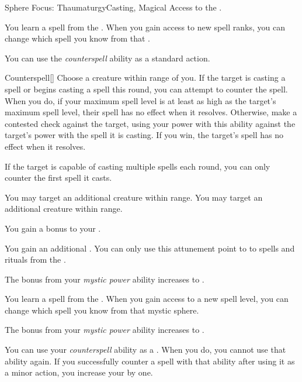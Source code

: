     \begin{feat}{Sphere Focus: Thaumaturgy}{Casting, Magical}
        \featpre Access to the  .

         You learn a spell from the  .
        When you gain access to new spell ranks, you can change which spell you know from that .

         You can use the \textit{counterspell} ability as a standard action.
        \begin{freeability}{Counterspell}[]
            Choose a creature within \rngmed range of you.
            If the target is casting a spell or begins casting a spell this round, you can attempt to counter the spell.
            When you do, if your maximum spell level is at least as high as the target's maximum spell level, their spell has no effect when it resolves.
            Otherwise, make a contested  check against the target, using your power with this ability against the target's power with the spell it is casting.
            If you win, the target's spell has no effect when it resolves.

            If the target is capable of casting multiple spells each round, you can only counter the first spell it casts.

            \rankline
             You may target an additional creature within range.
             You may target an additional creature within range.
        \end{freeability}

         You gain a  bonus to your .

         You gain an additional .
        You can only use this attunement point to  to spells and rituals from the  .

         The bonus from your \textit{mystic power} ability increases to .

         You learn a spell from the  .
        When you gain access to a new spell level, you can change which spell you know from that mystic sphere.

         The bonus from your \textit{mystic power} ability increases to .

         You can use your \textit{counterspell} ability as a .
        When you do, you  cannot use that ability again.
        If you successfully counter a spell with that ability after using it as a minor action, you increase your  by one.
    \end{feat}

